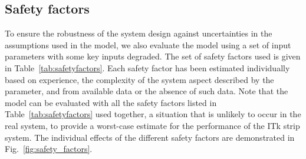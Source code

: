 \subsection{Safety factors}
\label{sec:safety_factors}
To ensure the robustness of the system design against uncertainties in the assumptions used in the model, we also evaluate the model using a set of input parameters with some key inputs degraded. The set of safety factors used is given in Table~\ref{tab:safetyfactors}. Each safety factor has been estimated individually based on experience, the complexity of the system aspect described by the parameter, and from available data or the absence of such data. Note that the model can be evaluated with all the safety factors listed in Table~\ref{tab:safetyfactors} used together, a situation that is unlikely to occur in the real system, to provide a worst-case estimate for the performance of the ITk strip system. The individual effects of the different safety factors are demonstrated in Fig.~\ref{fig:safety_factors}.

\let\arraystretcha\arraystretch %
\renewcommand\arraystretch{1.2} %
\begin{table}[htb]
\caption{Safety factors.}
\label{tab:safetyfactors}
\centering
{} %
\end{table}
\let\arraystretch\arraystretcha %


